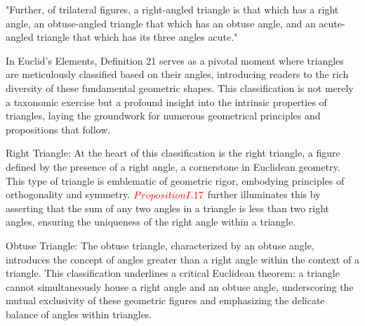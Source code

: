 
\begin{defin}
"Further, of trilateral figures, a right-angled triangle is that which has a right angle, an obtuse-angled triangle that which has an obtuse angle, and an acute-angled triangle that which has its three angles acute."
\end{defin}


In Euclid's Elements, Definition 21 serves as a pivotal moment where triangles are meticulously classified based on their angles, introducing readers to the rich diversity of these fundamental geometric shapes. This classification is not merely a taxonomic exercise but a profound insight into the intrinsic properties of triangles, laying the groundwork for numerous geometrical principles and propositions that follow.

Right Triangle: At the heart of this classification is the right triangle, a figure defined by the presence of a right angle, a cornerstone in Euclidean geometry. This type of triangle is emblematic of geometric rigor, embodying principles of orthogonality and symmetry. $\textcolor{red}{Proposition I.17}$ further illuminates this by asserting that the sum of any two angles in a triangle is less than two right angles, ensuring the uniqueness of the right angle within a triangle.

\begin{figure}[H]
\centering
{}
\end{figure}

\clearpage

Obtuse Triangle: The obtuse triangle, characterized by an obtuse angle, introduces the concept of angles greater than a right angle within the context of a triangle. This classification underlines a critical Euclidean theorem: a triangle cannot simultaneously house a right angle and an obtuse angle, underscoring the mutual exclusivity of these geometric figures and emphasizing the delicate balance of angles within triangles.

\begin{figure}[H]
\centering
{}
\end{figure}

